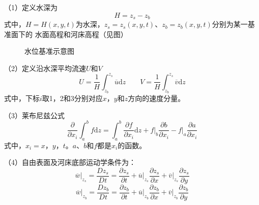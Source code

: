 （1）定义水深为
\begin{equation}
  H =  z_{s} - z_{b}
\end{equation}
式中，$H=H(x,y,t)$为水深，$ z_{s}= z_{s}(x,y,t)$、$z_{b}=z_{b}(x,y,t)$分别为某一基准面下的
水面高程和河床高程（见图）

\begin{figure}
  \begin{tikzpicture}
  \end{tikzpicture}
  \caption{水位基准示意图}
\end{figure}

（2）定义沿水深平均流速$U$和$V$
\begin{equation}
  U
  =
  \frac{1}{H}
  \int_{z_{b}}^{ z_{s}}\!\overline{u}\mathrm{d}z
  \quad
  \quad
  V
  =
  \frac{1}{H}
  \int_{z_{b}}^{ z_{s}}\!\overline{v}\mathrm{d}z
\end{equation}
式中，下标$i$取1，2和3分别对应$x$，$y$和$z$方向的速度分量。

（3）莱布尼兹公式
\begin{equation}
  \frac{\partial}{\partial x_{i}}
  \int_{a}^{b}\!f\mathrm{d}z
  =
  \int_{a}^{b}\!
  \frac{\partial f}{\partial x_{i}}\mathrm{d}z
  +
  \left.
    f
    \right|_{b}\frac{\partial b}{\partial x_{i}}
    -
    \left.f\right|_{a}\frac{\partial a}{\partial x_{i}}
      \label{EqCGeLeibnizLaw}
    \end{equation}
    式中，$x_{i}=x$，$y$，$t$。$a$、$b$和$f$都是$x_{i}$的函数。

    （4）自由表面及河床底部运动学条件为：
    \begin{equation}
      \left.\overline{w}\right|_{z_{s}}
        =
        \frac{D z_{s}}{Dt}
        =
        \frac{\partial z_{s}}{\partial t}
        +
        \left.\overline{u}\right|_{z_{s}}\frac{\partial z_{s}}{\partial x}
          +
          \left.\overline{v}\right|_{z_{s}}\frac{\partial z_{s}}{\partial y}
            \label{EqCGeSMC}
          \end{equation}
          \begin{equation}
            \left.\overline{w}\right|_{z_{b}}
              =
              \frac{Dz_{b}}{Dt}
              =
              \frac{\partial z_{b}}{\partial t}
              +
              \left.\overline{u}\right|_{z_{b}}\frac{\partial z_{b}}{\partial x}
                +
                \left.\overline{v}\right|_{z_{b}}\frac{\partial z_{b}}{\partial y}
                  \label{EqCGeBMC}
                \end{equation}

